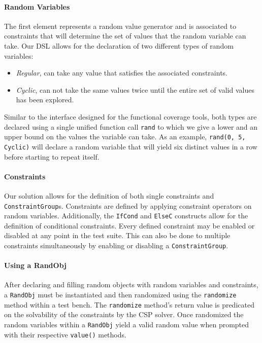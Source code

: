 \documentclass[conference]{IEEEtran}
\begin{document}
\paragraph{Random Variables} The first element represents a random value generator and is associated to constraints that will determine the set of values that the random variable can take.
Our DSL allows for the declaration of two different types of random variables: 
\begin{itemize}
	\item \emph{Regular}, can take any value that satisfies the associated constraints.
	\item \emph{Cyclic}, can not take the same values twice until the entire set of valid values has been explored.
\end{itemize}
Similar to the interface designed for the functional coverage tools, both types are declared using a single unified function call \texttt{rand} to which we give a lower and an upper bound on the values the variable can take.
As an example, \texttt{rand(0, 5, Cyclic)} will declare a random variable that will yield six distinct values in a row before starting to repeat itself.

\paragraph{Constraints} Our solution allows for the definition of both single constraints and \texttt{ConstraintGroup}s. 
Constraints are defined by applying constraint operators on random variables.
Additionally, the \texttt{IfCond} and \texttt{ElseC} constructs allow for the definition of conditional constraints.
Every defined constraint may be enabled or disabled at any point in the test suite. 
This can also be done to multiple constraints simultaneously by enabling or disabling a  \texttt{ConstraintGroup}.

\paragraph{Using a RandObj} After declaring and filling random objects with random variables and constraints, a \texttt{RandObj} must be instantiated and then randomized using the \texttt{randomize} method within a test bench.
The \texttt{randomize} method's return value is predicated on the solvability of the constraints by the CSP solver. 
Once randomized the random variables within a \texttt{RandObj} yield a valid random value when prompted with their respective \texttt{value()} methods.
\end{document}
